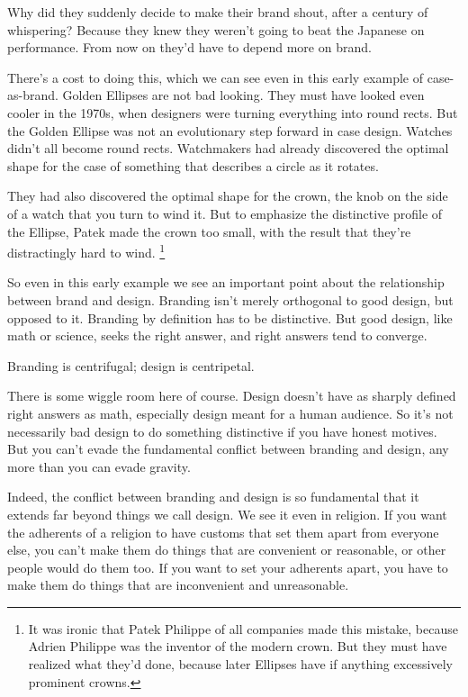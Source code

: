 \documentclass[12pt]{book}
\begin{document}
Why did they suddenly decide to make their brand shout, after a century
of whispering? Because they knew they weren't going to beat the Japanese
on performance. From now on they'd have to depend more on brand.

There's a cost to doing this, which we can see even in this early
example of case-as-brand. Golden Ellipses are not bad looking. They must
have looked even cooler in the 1970s, when designers were turning
everything into round rects. But the Golden Ellipse was not an
evolutionary step forward in case design. Watches didn't all become
round rects. Watchmakers had already discovered the optimal shape for
the case of something that describes a circle as it rotates.

They had also discovered the optimal shape for the crown, the knob on
the side of a watch that you turn to wind it. But to emphasize the
distinctive profile of the Ellipse, Patek made the crown too small, with
the result that they're distractingly hard to wind.
\footnote{It was ironic that Patek Philippe of all companies made this
mistake, because Adrien Philippe was the inventor of the modern crown.
But they must have realized what they'd done, because later Ellipses
have if anything excessively prominent crowns.}

So even in this early example we see an important point about the
relationship between brand and design. Branding isn't merely orthogonal
to good design, but opposed to it. Branding by definition has to be
distinctive. But good design, like math or science, seeks the right
answer, and right answers tend to converge.

Branding is centrifugal; design is centripetal.

There is some wiggle room here of course. Design doesn't have as sharply
defined right answers as math, especially design meant for a human
audience. So it's not necessarily bad design to do something distinctive
if you have honest motives. But you can't evade the fundamental conflict
between branding and design, any more than you can evade gravity.

Indeed, the conflict between branding and design is so fundamental that
it extends far beyond things we call design. We see it even in religion.
If you want the adherents of a religion to have customs that set them
apart from everyone else, you can't make them do things that are
convenient or reasonable, or other people would do them too. If you want
to set your adherents apart, you have to make them do things that are
inconvenient and unreasonable.
\end{document}
